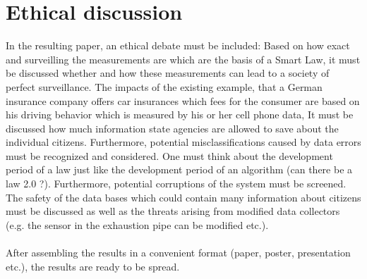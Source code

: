 \documentclass[12pt,a4paper]{article}
\begin{document}
	\section{Ethical discussion}
	
	In the resulting paper, an ethical debate must be included: Based on how exact and surveilling the measurements are which are the basis of a Smart Law, it must be discussed whether and how these measurements can lead to a society of perfect surveillance. The impacts of the existing example, that a German insurance company offers car insurances which fees for the consumer are based on his driving behavior which is measured by his or her cell phone data,  It must be discussed how much information state agencies are allowed to save about the individual citizens. Furthermore, potential misclassifications caused by data errors must be recognized and considered. One must think about the development period of a law just like the development period of an algorithm (can there be a law 2.0 ?). Furthermore, potential corruptions of the system must be screened. The safety of the data bases which could contain many information about citizens must be discussed as well as the threats arising from modified data collectors (e.g. the sensor in the exhaustion pipe can be modified etc.).
	\paragraph*{}
	After assembling the results in a convenient format (paper, poster, presentation etc.), the results are ready to be spread.
\end{document}
